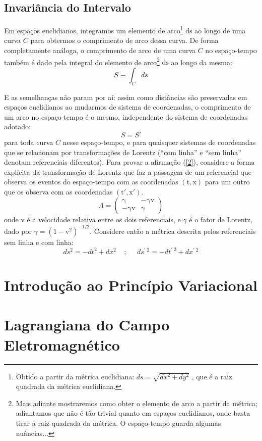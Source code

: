 \documentclass[12pt,a4paper]{article}
\begin{document}
\subsection{Invariância do Intervalo}

Em espaços euclidianos, integramos um elemento de arco\footnote{Obtido a partir da métrica euclidiana: $ds = \sqrt{dx^2 + dy^2}$ , que é a raiz quadrada da métrica euclidiana.} $\mathrm{ds}$
ao longo de uma curva $C$ para obtermos o comprimento de arco dessa curva. De forma completamente análoga,
o comprimento de arco de uma curva $C$ no espaço-tempo também é dado pela integral do elemento de arco\footnote{Mais adiante mostraremos como obter o elemento de arco a partir da métrica; adiantamos que não é tão trivial quanto em espaços euclidianos, onde basta tirar a raiz quadrada da métrica. O espaço-tempo guarda algumas nuâncias...} 
$\mathrm{ds}$ ao longo da mesma:
\begin{equation}
  S \equiv \int_{C} ds 
\end{equation}

E as semelhanças não param por aí: assim como distâncias são preservadas em espaços euclidianos ao mudarmos de sistema de coordenadas, o comprimento
de um arco no espaço-tempo é o mesmo, independente do sistema de coordenadas adotado:
\begin{equation}
  S = S' 
  \label{2}
\end{equation}
para toda curva $C$ nesse espaço-tempo, e para quaisquer sistemas de coordenadas que se relacionam por
transformações de Lorentz (\enquote{com linha} e \enquote{sem linha} denotam referenciais diferentes). Para
provar a afirmação (\ref{2}), considere a forma explícita da transformação de Lorentz que faz a passagem de
um referencial que observa os eventos do espaço-tempo com as coordenadas $\mathrm{(t,x)}$ para um outro que
os observa com as coordenadas $\mathrm{(t',x')}$.
\begin{equation*}
  \Lambda = \begin{pmatrix*} \mathrm{\gamma} &  \mathrm{-\gamma v}\\
                          \mathrm{-\gamma v} & \mathrm{\gamma}  \end{pmatrix*}
\end{equation*}
onde $\mathrm{v}$ é a velocidade relativa entre os dois referenciais, e $\gamma$ é o fator de Lorentz, dado por
$\gamma = \mathrm{(1-v^2)^{-1/2}}$. Considere então a métrica descrita pelos referenciais sem linha e com linha:
\begin{equation*}
  ds^2 = -dt^2 + dx^2 \;\;\;\;;\;\;\;\;\; ds^{\prime\; 2} = -dt^{\prime\; 2} + dx^{\prime\; 2}
\end{equation*}

\section{Introdução ao Princípio Variacional}

\section{Lagrangiana do Campo Eletromagnético}

\newpage
\printbibliography
\end{document}
